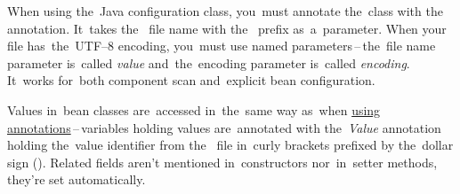 When using the~Java configuration class, you~must annotate the~class with the~ annotation. It~takes the~ file name with the~ prefix as~a~parameter. When your  file has~the~UTF--8 encoding, you~must use named parameters\,--\,the~file name parameter is~called \textit{value} and~the~encoding parameter is~called \textit{encoding}. It~works for~both component scan and~explicit bean configuration.

Values in~bean classes are~accessed in~the~same way as~when \hyperref[readingpropertiesannotations]{using annotations}\,--\,variables holding values are~annotated with the~\textit{Value} annotation holding the~value identifier from the~ file in~curly brackets prefixed by the~dollar sign (). Related fields aren't mentioned in~constructors nor~in~setter methods, they're set automatically.

